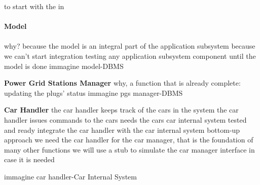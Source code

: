 \documentclass[english]{article}
\begin{document}
to start with the in


\paragraph{Model}
\paragraph{}
why?
because the model is an integral part of the application subsystem
because we can’t start integration testing any application subsystem component until the model is done
immagine model-DBMS
\begin{figure}[H]
	\centering
\end{figure}

\textbf{Power Grid Stations Manager}
why,  a function that is already complete: updating the plugs’ status
immagine pgs manager-DBMS
\begin{figure}[H]
	\centering
\end{figure}

\textbf{Car Handler}
the car handler keeps track of the cars in the system
the car handler issues commands to the cars
needs the cars
car internal system tested and ready
integrate the car handler with the car internal system
bottom-up approach
we need the car handler for the car manager, that is the foundation of many other functions
we will use a stub to simulate the car manager interface in case it is needed

immagine car handler-Car Internal System
\begin{figure}[H]
	\centering
\end{figure}
\end{document}
